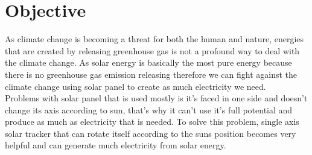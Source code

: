 \section*{Objective}
As climate change is becoming a threat for both the human and nature, energies that are created by releasing greenhouse gas is not a profound way to deal with the climate change. As solar energy is basically the most pure energy because there is no greenhouse gas emission releasing therefore we can fight against the climate change using solar panel to create as much electricity we need.\\
Problems with solar panel that is used mostly is it's faced in one side and doesn't change its axis according to sun, that's why it can't use it's full potential and produce as much as electricity that is needed. To solve this problem, single axis solar tracker that can rotate itself according to the suns position becomes very helpful and can generate much electricity from solar energy.

